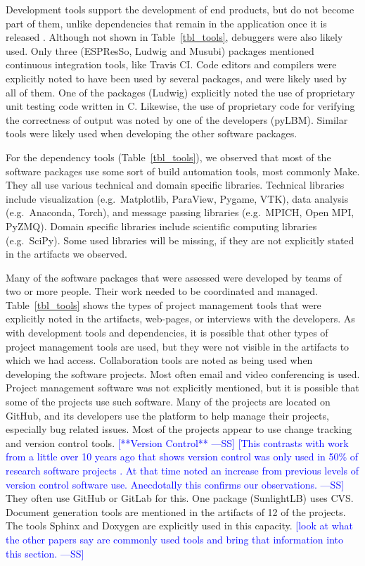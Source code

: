\documentclass[final, 3p, times, authoryear]{elsarticle}
\newcommand{\authornote}[3]{\textcolor{#1}{[#3 ---#2]}}
\newcommand{\authornote}[3]{}
\newcommand{\wss}[1]{\authornote{blue}{SS}{#1}} %
\begin{document}
Development tools support the development of end products, but do not become
part of them, unlike dependencies that remain in the application once it is
released \citep{ghezzi1991fundamentals}. Although not shown in
Table~\ref{tbl_tools}, debuggers were also likely used.  Only three (ESPResSo,
Ludwig and Musubi) packages mentioned continuous integration tools, like Travis
CI. Code editors and compilers were explicitly noted to have been used by
several packages, and were likely used by all of them. One of the packages
(Ludwig) explicitly noted the use of proprietary unit testing code written in C.
Likewise, the use of proprietary code for verifying the correctness of output
was noted by one of the developers (pyLBM). Similar tools were likely used when
developing the other software packages.

For the dependency tools (Table~\ref{tbl_tools}), we observed that most of the
software packages use some sort of build automation tools, most commonly Make.
They all use various technical and domain specific libraries. Technical
libraries include visualization (e.g.\ Matplotlib, ParaView, Pygame, VTK), data
analysis (e.g.\ Anaconda, Torch), and message passing libraries (e.g.\ MPICH,
Open MPI, PyZMQ). Domain specific libraries include scientific computing
libraries (e.g.\ SciPy). Some used libraries will be missing, if they are not
explicitly stated in the artifacts we observed.

Many of the software packages that were assessed were developed by teams of two
or more people. Their work needed to be coordinated and managed.
Table~\ref{tbl_tools} shows the types of project management tools that were
explicitly noted in the artifacts, web-pages, or interviews with the developers.
As with development tools and dependencies, it is possible that other types of
project management tools are used, but they were not visible in the artifacts to
which we had access.  Collaboration tools are noted as being used when
developing the software projects. Most often email and video conferencing is
used. Project management software was not explicitly mentioned, but it is
possible that some of the projects use such software. Many of the projects are
located on GitHub, and its developers use the platform to help manage their
projects, especially bug related issues. Most of the projects appear to use
change tracking and version control tools. \wss{**Version Control**} \wss{This
contrasts with work from a little over 10 years ago that shows version control
was only used in 50\% of research software projects \citep{Nguyen-HoanEtAl2010}.
At that time \citet{Nguyen-HoanEtAl2010} noted an increase from previous levels
of version control software use.  Anecdotally this confirms our observations.}
They often use GitHub or GitLab for this. One package (SunlightLB) uses CVS.
Document generation tools are mentioned in the artifacts of 12 of the projects.
The tools Sphinx and Doxygen are explicitly used in this capacity. \wss{look at
what the other papers say are commonly used tools and bring that information
into this section.}
\end{document}
